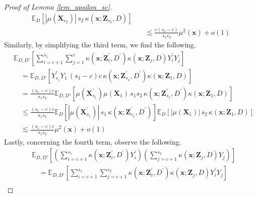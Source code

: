 \documentclass[letterpaper,10pt]{article}
\numberwithin{equation}{section}
\numberwithin{thm}{section}
\numberwithin{lem}{section}
\numberwithin{cor}{section}
\newcommand{\E}{\mathbb{E}}
\newcommand{\1}{\mathbbm{1}}
\begin{document}
\begin{proof}[Proof of Lemma \ref{lem_upsilon_sc}]
\begin{equation}
\begin{aligned}
			\E_{D}\left[|\mu(\mathbf{X}_{s_2})| \, s_2  \,\kappa(\mathbf{x}; \mathbf{Z}_{s_2}, D)\right]                                                                              \\
			 & \quad \lesssim \frac{c(s_2 - c)}{s_1 s_2} \mu^2(\mathbf{x}) + o(1)
		\end{aligned}
	\end{equation}
	Similarly, by simplifying the third term, we find the following.
	\begin{equation}
		\begin{aligned}
			 & \E_{D, D'}\left[\sum_{i = c+1}^{s_1}\sum_{j = 1}^{c} \kappa(\mathbf{x}; \mathbf{Z}_i^{\prime}, D^{\prime})\kappa(\mathbf{x}; \mathbf{Z}_j, D)Y_i^{\prime} Y_j\right]                                                \\
			 & \quad = \E_{D, D'}\left[Y_{s_1}^{\prime} Y_{1} \, (s_1 - c)c \, \kappa(\mathbf{x}; \mathbf{Z}_{s_1}^{\prime}, D^{\prime})\kappa(\mathbf{x}; \mathbf{Z}_1, D)\right]                                                 \\
			 & \quad = \frac{(s_1 - c)c}{s_1 s_2}\E_{D, D'}\left[\mu(\mathbf{X}_{s_1}^{\prime})\mu(\mathbf{X}_1) \, s_1 s_2 \, \kappa(\mathbf{x}; \mathbf{Z}_{s_1}^{\prime}, D^{\prime})\kappa(\mathbf{x}; \mathbf{Z}_1, D)\right] \\
			 & \quad \leq \frac{(s_1 - c)c}{s_1 s_2}
			\E_{D}\left[|\mu(\mathbf{X}_{s_1}^{\prime})| \, s_1 \, \kappa(\mathbf{x}; \mathbf{Z}_{s_1}^{\prime}, D^{\prime})\right]
			\E_{D}\left[|\mu(\mathbf{X}_1)| \, s_2 \, \kappa(\mathbf{x}; \mathbf{Z}_1, D)\right]                                                                                                                                   \\
			 & \quad \lesssim \frac{(s_1 - c)c}{s_1 s_2} \mu^2(\mathbf{x}) + o(1)
		\end{aligned}
	\end{equation}
	Lastly, concerning the fourth term, observe the following.
	\begin{equation}
		\begin{aligned}
			 & \E_{D, D'}\left[\left(\sum_{i = c+1}^{s_1}\kappa(\mathbf{x}; \mathbf{Z}_i^{\prime}, D^{\prime}) Y_i^{\prime}\right)
			\left(\sum_{j = c+1}^{s_2} \kappa(\mathbf{x}; \mathbf{Z}_j, D) Y_j\right)\right]                                                                                                                                                         \\
			 & \quad = \E_{D, D'}\left[\sum_{i = c+1}^{s_1}\sum_{j = c+1}^{s_2}\kappa(\mathbf{x}; \mathbf{Z}_i^{\prime}, D^{\prime}) \kappa(\mathbf{x}; \mathbf{Z}_j, D)  Y_i^{\prime}Y_j\right]                                                     \\

\end{aligned}
\end{equation}
\end{proof}
\end{document}
